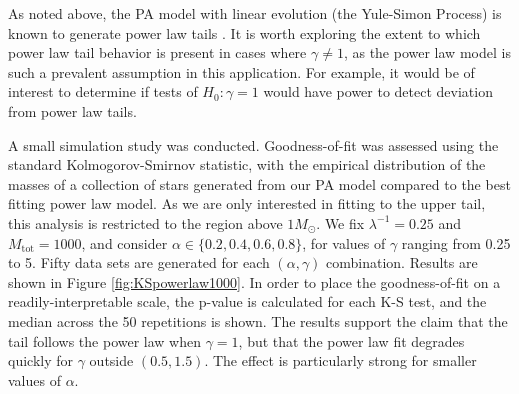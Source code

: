 \documentclass[ejs]{imsart}
\numberwithin{equation}{section}
\theoremstyle{plain}
\newcommand{\jessi}[1]{{\color{blue}[[\textbf{Jessi: }#1]]}}
\newcommand{\Msun}{M_{\odot}}
\newcommand{\Mtot}{M_{\text{tot}}}
\begin{document}
As noted above, the PA model with linear evolution (the Yule-Simon Process) is 
known to generate power law tails \citep{newman2005}.
It is worth exploring the extent to which power law tail behavior is present 
in cases where $\gamma \neq 1$, as the power law model is such a prevalent
assumption in this application. For example, it would be of interest to determine
if tests of $H_0\!:\gamma = 1$ would have power to detect deviation from
power law tails.

A small simulation study was conducted. Goodness-of-fit was assessed using the
standard Kolmogorov-Smirnov statistic, with the empirical distribution
of the masses of a collection of stars generated 
from our PA model compared to the best fitting power law model.
As we are only interested in fitting to the upper tail, this analysis 
is restricted to the region above $1 \Msun$. We fix $\lambda^{-1} = 0.25$
and $\Mtot = 1000$, and consider $\alpha \in \{0.2,0.4,0.6,0.8\}$, for
values of $\gamma$ ranging from 0.25 to 5. Fifty data sets are generated
for each $(\alpha, \gamma)$ combination. Results are shown in Figure \ref{fig:KSpowerlaw1000}.
In order to place the goodness-of-fit on a readily-interpretable scale, the p-value
is calculated for each K-S test, and the median across the 50 repetitions is shown.
The results support the claim that the tail follows the power law when $\gamma = 1$, but that
the power law fit degrades quickly for $\gamma$ outside $(0.5, 1.5)$. The effect is particularly
strong for smaller values of $\alpha$.

\end{document}
